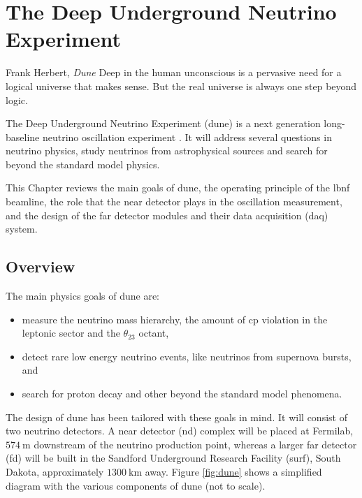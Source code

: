 \chapter{The Deep Underground Neutrino Experiment}
\label{chapter:dune}

\begin{chapquote}{Frank Herbert, \textit{Dune}}
	Deep in the human unconscious is a pervasive need for a logical universe that makes sense. But the real universe is always one step beyond logic.
\end{chapquote}

The Deep Underground Neutrino Experiment (\gls{dune}) is a next generation long-baseline neutrino oscillation experiment \cite{DUNE2020TDR1}. It will address several questions in neutrino physics, study neutrinos from astrophysical sources and search for beyond the standard model physics.

This Chapter reviews the main goals of \gls{dune}, the operating principle of the \gls{lbnf} beamline, the role that the near detector plays in the oscillation measurement, and the design of the far detector modules and their data acquisition (\gls{daq}) system.

\section{Overview}

The main physics goals of \gls{dune} are:
\begin{itemize}
	\item measure the neutrino mass hierarchy, the amount of \gls{cp} violation in the leptonic sector and the $\theta_{23}$ octant,
	\item detect rare low energy neutrino events, like neutrinos from supernova bursts, and
	\item search for proton decay and other beyond the standard model phenomena.
\end{itemize}

The design of \gls{dune} has been tailored with these goals in mind. It will consist of two neutrino detectors. A near detector (\gls{nd}) complex will be placed at Fermilab, $574~\mathrm{m}$ downstream of the neutrino production point, whereas a larger far detector (\gls{fd}) will be built in the Sandford Underground Research Facility (\gls{surf}), South Dakota, approximately $1300~\mathrm{km}$ away. Figure \ref{fig:dune} shows a simplified diagram with the various components of \gls{dune} (not to scale).

